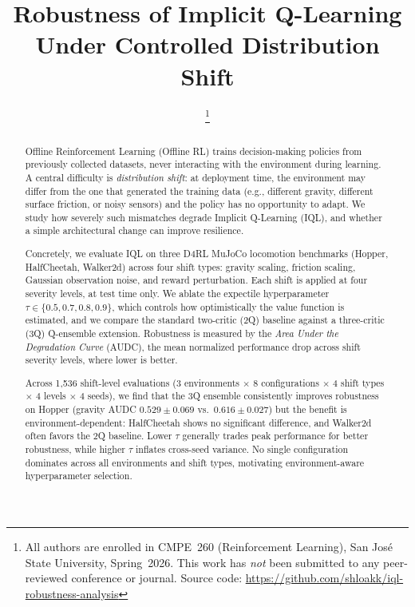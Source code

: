 \documentclass[conference]{IEEEtran}
\begin{document}
\title{Robustness of Implicit Q-Learning Under Controlled Distribution Shift}

\author{
  \thanks{All authors are enrolled in CMPE~260 (Reinforcement Learning),
          San Jos\'{e} State University, Spring~2026.
          This work has \emph{not} been submitted to any peer-reviewed
          conference or journal.
          Source code: \url{https://github.com/shloakk/iql-robustness-analysis}}
}

\maketitle

\begin{abstract}
Offline Reinforcement Learning (Offline RL) trains decision-making policies from
previously collected datasets, never interacting with the environment during
learning. A central difficulty is \emph{distribution shift}: at deployment time,
the environment may differ from the one that generated the training data (e.g.,
different gravity, different surface friction, or noisy sensors) and the policy
has no opportunity to adapt. We study how severely such mismatches degrade
Implicit Q-Learning (IQL), and whether a simple architectural change can improve
resilience.

Concretely, we evaluate IQL on three D4RL MuJoCo locomotion benchmarks
(Hopper, HalfCheetah, Walker2d) across four shift types: gravity scaling,
friction scaling, Gaussian observation noise, and reward perturbation. Each
shift is applied at four severity levels, at test time only. We ablate the
expectile hyperparameter $\tau \in \{0.5, 0.7, 0.8, 0.9\}$, which controls how
optimistically the value function is estimated, and we compare the standard
two-critic (2Q) baseline against a three-critic (3Q) Q-ensemble extension.
Robustness is measured by the \emph{Area Under the Degradation Curve} (AUDC),
the mean normalized performance drop across shift severity levels, where lower
is better.

Across 1,536 shift-level evaluations (3 environments $\times$ 8 configurations
$\times$ 4 shift types $\times$ 4 levels $\times$ 4 seeds), we find that the
3Q ensemble consistently improves robustness on Hopper (gravity AUDC
$0.529 \pm 0.069$ vs.\ $0.616 \pm 0.027$) but the benefit is
environment-dependent: HalfCheetah shows no significant difference, and
Walker2d often favors the 2Q baseline. Lower $\tau$ generally trades peak
performance for better robustness, while higher $\tau$ inflates cross-seed
variance. No single configuration dominates across all environments and shift
types, motivating environment-aware hyperparameter selection.
\end{abstract}
\end{document}

